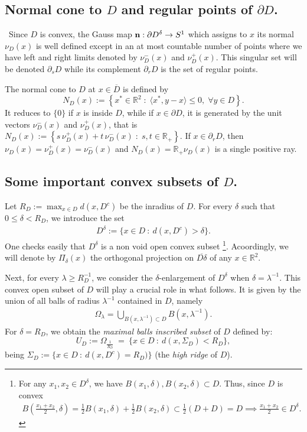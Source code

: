 \documentclass[reqno,11pt]{amsart}
\theoremstyle{definition}
\numberwithin{equation}{section}
\def\ov{\overline}
\newcommand{\RR}{\mathbb{R}}
\def\R{\mathbb{R}}
\newcommand{\ps}[1]{\langle #1\rangle}
\newcommand{\1}{{{\bf 1}\kern-0,28em\rm l}}
\newcommand{\med}{\medskip\noindent}
\def\sepa{\; : \;}
\def\n{{\bf n}}
\newcommand{\aco}[1]{\left\{#1\right\}}
\def\l{\lambda}
\begin{document}
\subsection*{Normal cone to $D$ and regular points of $\partial D$.}\ Since $D$ is convex, the Gauss map $\n:\partial D^\delta \to S^1$ which assigns to  $x$   its normal $\nu_D(x)$ is well defined except in an at most countable number of points where we have left and right limits  denoted by $\nu_D^-(x)$ and $\nu_D^+(x)$. This singular set will be denoted $\partial_s D$ while its complement $\partial_r D$ is the set of regular points. 

The normal cone to $D$ at $x \in \ov D$ is defined by  
$$ N_{D}(x):= \aco{x^*\in\RR^2 \sepa \ps{x^*,y-x} \le 0,\; \forall y\in D }.$$
It reduces to $\{0\}$ if $x$ is inside $D$, while if $x\in \partial D$, it is generated by the unit vectors $\nu_D^-(x)$ and $\nu_D^+(x)$, that is $N_D(x):=\aco{ s\,\nu_D^+(x) + t\,\nu_D^-(x) \sepa s,t \in \RR_+ }$.
If $x\in\partial_r D$, then $\nu_D(x) =\nu_D^+(x) =\nu_D^-(x)$ and $N_D(x)= \RR_+ \nu_{D}(x)$ is a single positive ray.

\subsection*{Some important convex subsets of $D$. }
Let $R_D:= \max_{x\in D} d(x, D^c)$ be the inradius of $D$. For every $\delta$ such that $0\le \delta<R_D$, we introduce the set
\begin{align*}
D^\delta:= \{x\in D\ :\ d(x, D^c) >\delta \}.
\end{align*}
One checks easily that $D^\delta$ is a non void open convex subset 
\footnote{For any $x_1,x_2\in D^\delta$, we have $B(x_1,\delta), B(x_2,\delta)\subset D$. Thus, since $D$ is convex
\begin{align*}
B(\frac{x_1 + x_2}{2},\delta)= \frac1{2} B(x_1,\delta) + \frac1{2} B(x_2,\delta)\subset \frac1{2} (D+D)  =D \implies \frac{x_1 +x_2}{2} \in D^\delta.
\end{align*}
}. 
Acoordingly, we will denote by $\Pi_\delta(x)$ the orthogonal projection on $\ov {D\delta}$ of any $x\in\R^2$. 

\med
Next, for every $\lambda \ge R_D^{-1}$, we consider the $\delta$-enlargement of $D^\delta$ when $\delta= \l^{-1}$.  This  convex open subset of $D$ will play a crucial role in what follows. It is given by the union of all balls of radius $\lambda^{-1}$ contained in $D$, namely
\begin{align}\label{def:Olambda}
\Omega_\lambda = \bigcup_{ B(x,\lambda^{-1}) \subset D} B(x,\lambda^{-1}).
\end{align}
For $\delta= R_D$, we obtain the \emph {maximal balls inscribed subset} of $D$ defined by:   
$$U_D:=\Omega_{\frac{1}{R_D}} \ =\  \{ x\in D \ :\ d(x, \Sigma_D) < R_D \} ,$$
 being  $\Sigma_D :=\{ x\in D\ :\ d(x, D^c) = R_D)\}$ (the \emph{ high ridge} of $D$).
\end{document}

